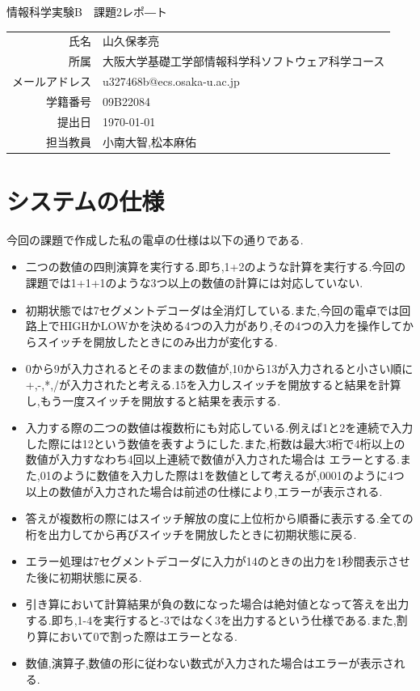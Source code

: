 \documentclass[dvipdfmx]{jarticle}
\begin{document}
\begin{titlepage}
    \begin{center}
        {\huge 情報科学実験B　課題2レポ―ト}
        \vspace{180pt}\\
        \begin{tabular}{rl}
            氏名 & 山久保孝亮\\
            所属 & 大阪大学基礎工学部情報科学科ソフトウェア科学コース\\
            メールアドレス & u327468b@ecs.osaka-u.ac.jp\\
            学籍番号 & 09B22084\\
            提出日 & \today\\
            担当教員 & 小南大智,松本麻佑
        \end{tabular}
    \end{center}
\end{titlepage}
\section{システムの仕様}
今回の課題で作成した私の電卓の仕様は以下の通りである.
\begin{itemize}
    \item 二つの数値の四則演算を実行する.即ち,1+2のような計算を実行する.今回の課題では1+1+1のような3つ以上の数値の計算には対応していない.
    \item 初期状態では7セグメントデコーダは全消灯している.また,今回の電卓では回路上でHIGHかLOWかを決める4つの入力があり,その4つの入力を操作してからスイッチを開放したときにのみ出力が変化する.
    \item 0から9が入力されるとそのままの数値が,10から13が入力されると小さい順に+,-,*,/が入力されたと考える.15を入力しスイッチを開放すると結果を計算し,もう一度スイッチを開放すると結果を表示する.
    \item 入力する際の二つの数値は複数桁にも対応している.例えば1と2を連続で入力した際には12という数値を表すようにした.また,桁数は最大3桁で4桁以上の数値が入力すなわち4回以上連続で数値が入力された場合は
    エラーとする.また,01のように数値を入力した際は1を数値として考えるが,0001のように4つ以上の数値が入力された場合は前述の仕様により,エラーが表示される.
    \item 答えが複数桁の際にはスイッチ解放の度に上位桁から順番に表示する.全ての桁を出力してから再びスイッチを開放したときに初期状態に戻る.
    \item エラー処理は7セグメントデコーダに入力が14のときの出力を1秒間表示させた後に初期状態に戻る.
    \item 引き算において計算結果が負の数になった場合は絶対値となって答えを出力する.即ち,1-4を実行すると-3ではなく3を出力するという仕様である.また,割り算において0で割った際はエラーとなる.
    \item 数値,演算子,数値の形に従わない数式が入力された場合はエラーが表示される.
\end{itemize}
\end{document}
